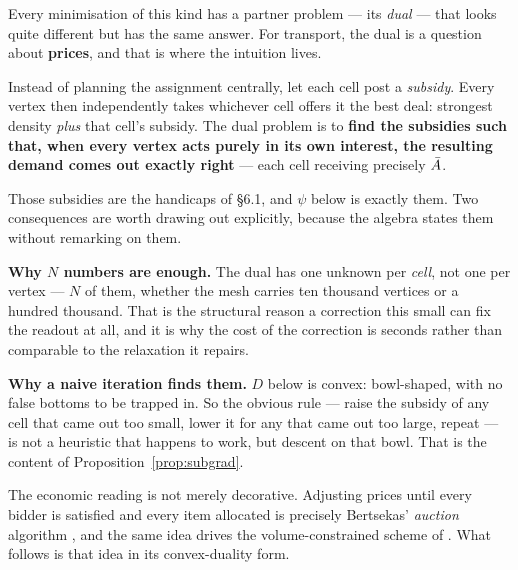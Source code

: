 \documentclass[11pt,a4paper]{article}
\begin{document}
\begin{tcolorbox}[colback=olive!4!white, colframe=olive!55!black,
                  title={Intuition: the dual is a pricing problem},
                  fontupper=\small]
Every minimisation of this kind has a partner problem --- its \emph{dual} --- that
looks quite different but has the same answer. For transport, the dual is a
question about \textbf{prices}, and that is where the intuition lives.

Instead of planning the assignment centrally, let each cell post a
\emph{subsidy}. Every vertex then independently takes whichever cell offers it the
best deal: strongest density \emph{plus} that cell's subsidy. The dual problem is
to \textbf{find the subsidies such that, when every vertex acts purely in its own
interest, the resulting demand comes out exactly right} --- each cell receiving
precisely $\bar{A}$.

Those subsidies are the handicaps of \S6.1, and $\psi$ below is exactly them. Two
consequences are worth drawing out explicitly, because the algebra states them
without remarking on them.

\textbf{Why $N$ numbers are enough.} The dual has one unknown per \emph{cell},
not one per vertex --- $N$ of them, whether the mesh carries ten thousand vertices
or a hundred thousand. That is the structural reason a correction this small can
fix the readout at all, and it is why the cost of the correction is seconds rather
than comparable to the relaxation it repairs.

\textbf{Why a naive iteration finds them.} $D$ below is convex: bowl-shaped, with
no false bottoms to be trapped in. So the obvious rule --- raise the subsidy of any
cell that came out too small, lower it for any that came out too large, repeat ---
is not a heuristic that happens to work, but descent on that bowl. That is the
content of Proposition~\ref{prop:subgrad}.

The economic reading is not merely decorative. Adjusting prices until every
bidder is satisfied and every item allocated is precisely Bertsekas' \emph{auction}
algorithm \cite{bertsekas1988auction}, and the same idea drives the
volume-constrained scheme of \cite{jacobs2018auction}. What follows is that idea
in its convex-duality form.
\end{tcolorbox}
\end{document}
